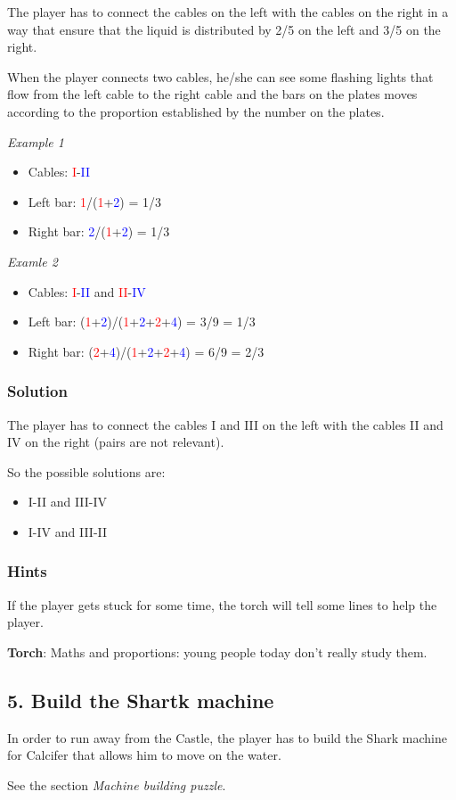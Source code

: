 The player has to connect the cables on the left with the cables on the right in a way that ensure that the liquid is distributed by 2/5 on the left and 3/5 on the right.

When the player connects two cables, he/she can see some flashing lights that flow from the left cable to the right cable and the bars on the plates moves according to the proportion established by the number on the plates.

\textit{Example 1}
\begin{itemize}
	\item Cables: \textcolor{red}{I}-\textcolor{blue}{II}
	\item Left bar: \textcolor{red}{1}/(\textcolor{red}{1}+\textcolor{blue}{2}) = 1/3
	\item Right bar: \textcolor{blue}{2}/(\textcolor{red}{1}+\textcolor{blue}{2}) = 1/3
\end{itemize}

\textit{Examle 2}
\begin{itemize}
	\item Cables: \textcolor{red}{I}-\textcolor{blue}{II} and \textcolor{red}{II}-\textcolor{blue}{IV}
	\item Left bar: (\textcolor{red}{1}+\textcolor{blue}{2})/(\textcolor{red}{1}+\textcolor{blue}{2}+\textcolor{red}{2}+\textcolor{blue}{4}) = 3/9 = 1/3
	\item Right bar: (\textcolor{red}{2}+\textcolor{blue}{4})/(\textcolor{red}{1}+\textcolor{blue}{2}+\textcolor{red}{2}+\textcolor{blue}{4}) = 6/9 = 2/3
\end{itemize}

\subsubsection*{Solution}
The player has to connect the cables I and III on the left with the cables II and IV on the right (pairs are not relevant).

So the possible solutions are:
\begin{itemize}
	\item I-II and III-IV
	\item I-IV and III-II
\end{itemize}

\subsubsection*{Hints}
If the player gets stuck for some time, the torch will tell some lines to help the player.

\textbf{Torch}: Maths and proportions: young people today don't really study them.

\subsection{5. Build the Shartk machine}

In order to run away from the Castle, the player has to build the Shark machine for Calcifer that allows him to move on the water.

See the section \textit{Machine building puzzle}.

